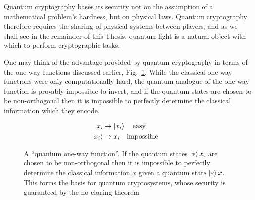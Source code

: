 Quantum cryptography bases its security not on the assumption of a mathematical problem's hardness, but on physical laws. Quantum cryptography therefore requires the sharing of physical systems between players, and as we shall see in the remainder of this Thesis, quantum light is a natural object with which to perform cryptographic tasks. 

One may think of the advantage provided by quantum cryptography in terms of the one-way functions discussed earlier, Fig.~\ref{fig:qutrapdoor}. While the classical one-way functions were only computationally hard, the quantum analogue of the one-way function is provably impossible to invert, and if the quantum states are chosen to be non-orthogonal then it is impossible to perfectly determine the classical information which they encode. 

\begin{figure}[h!]
\centering
\begin{framed}
\begin{align*}
x_i &\mapsto \ket{x_i} \qq{easy}\\
\ket{x_i} &\mapsto x_i \qq{impossible}
\end{align*}
\caption{A ``quantum one-way function''. If the quantum states $\ket*{x_i}$ are chosen to be non-orthogonal then it is impossible to perfectly determine the classical information $x$ given a quantum state $\ket*{x}$. This forms the basis for quantum cryptosystems, whose security is guaranteed by the no-cloning theorem}
\label{fig:qutrapdoor}
\end{framed}
\end{figure}

\clearpage





